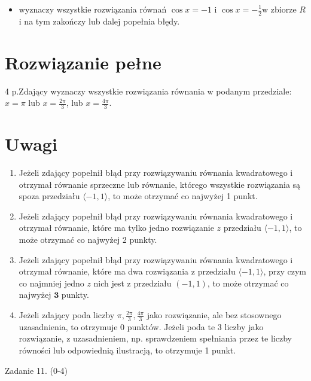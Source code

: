 \documentclass[10pt]{article}
\begin{document}
\begin{itemize}
  \item wyznaczy wszystkie rozwiązania równań $\cos x=-1$ i $\cos x=-\frac{1}{2} \mathrm{w}$ zbiorze $R$ i na tym zakończy lub dalej popełnia błędy.
\end{itemize}

\section*{Rozwiązanie pełne}
 4 p.Zdający wyznaczy wszystkie rozwiązania równania w podanym przedziale:\\
$x=\pi$ lub $x=\frac{2 \pi}{3}$, lub $x=\frac{4 \pi}{3}$.

\section*{Uwagi}
\begin{enumerate}
  \item Jeżeli zdający popełnił błąd przy rozwiązywaniu równania kwadratowego i otrzymał równanie sprzeczne lub równanie, którego wszystkie rozwiązania są spoza przedziału $\langle-1,1\rangle$, to może otrzymać co najwyżej 1 punkt.
  \item Jeżeli zdający popełnił błąd przy rozwiązywaniu równania kwadratowego i otrzymał równanie, które ma tylko jedno rozwiązanie $z$ przedziału $\langle-1,1\rangle$, to może otrzymać co najwyżej 2 punkty.
  \item Jeżeli zdający popełnił błąd przy rozwiązywaniu równania kwadratowego i otrzymał równanie, które ma dwa rozwiązania z przedziału $\langle-1,1\rangle$, przy czym co najmniej jedno $z$ nich jest z przedziału $(-1,1)$, to może otrzymać co najwyżej $\mathbf{3}$ punkty.
  \item Jeżeli zdający poda liczby $\pi, \frac{2 \pi}{3}, \frac{4 \pi}{3}$ jako rozwiązanie, ale bez stosownego uzasadnienia, to otrzymuje 0 punktów. Jeżeli poda te 3 liczby jako rozwiązanie, z uzasadnieniem, np. sprawdzeniem spełniania przez te liczby równości lub odpowiednią ilustracją, to otrzymuje 1 punkt.
\end{enumerate}

Zadanie 11. (0-4)
\end{document}

